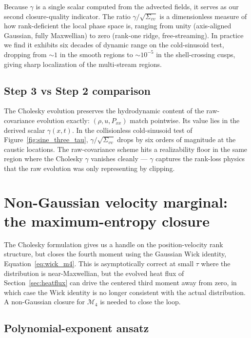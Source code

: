 \documentclass[11pt,letterpaper]{article}
\begin{document}
Because $\gamma$ is a single scalar computed from the advected fields, it serves as our second closure-quality indicator. The ratio $\gamma/\sqrt{\Sigma_{vv}}$ is a dimensionless measure of how rank-deficient the local phase space is, ranging from unity (axis-aligned Gaussian, fully Maxwellian) to zero (rank-one ridge, free-streaming). In practice we find it exhibits six decades of dynamic range on the cold-sinusoid test, dropping from $\sim 1$ in the smooth regions to $\sim 10^{-5}$ in the shell-crossing cusps, giving sharp localization of the multi-stream regions.

\subsection{Step 3 vs Step 2 comparison}

The Cholesky evolution preserves the hydrodynamic content of the raw-covariance evolution exactly: $(\rho, u, P_{xx})$ match pointwise. Its value lies in the derived scalar $\gamma(x, t)$. In the collisionless cold-sinusoid test of Figure~\ref{fig:sine_three_tau}, $\gamma/\sqrt{\Sigma_{vv}}$ drops by six orders of magnitude at the caustic locations. The raw-covariance scheme hits a realizability floor in the same region where the Cholesky $\gamma$ vanishes cleanly --- $\gamma$ captures the rank-loss physics that the raw evolution was only representing by clipping.

\section{Non-Gaussian velocity marginal: the maximum-entropy closure}
\label{sec:maxent}

The Cholesky formulation gives us a handle on the position-velocity rank structure, but closes the fourth moment using the Gaussian Wick identity, Equation~\eqref{eq:wick_m4}. This is asymptotically correct at small $\tau$ where the distribution is near-Maxwellian, but the evolved heat flux of Section~\ref{sec:heatflux} can drive the centered third moment away from zero, in which case the Wick identity is no longer consistent with the actual distribution. A non-Gaussian closure for $\mathcal{M}_4$ is needed to close the loop.

\subsection{Polynomial-exponent ansatz}
\end{document}
